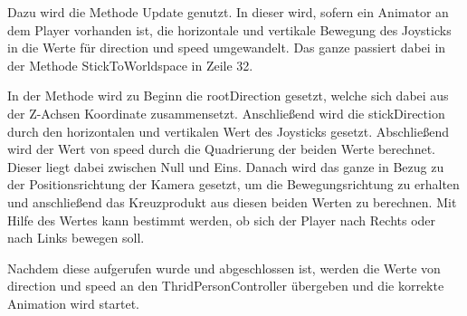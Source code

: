 			Dazu wird die Methode Update genutzt. In dieser wird, sofern ein Animator an dem Player vorhanden ist, die horizontale und vertikale Bewegung des Joysticks in die Werte für direction und speed umgewandelt. Das ganze passiert dabei in der Methode StickToWorldspace in Zeile 32. 

			In der Methode wird zu Beginn die rootDirection gesetzt, welche sich dabei aus der Z-Achsen Koordinate zusammensetzt. Anschließend wird die stickDirection durch den horizontalen und vertikalen Wert des Joysticks gesetzt. Abschließend wird der Wert von speed durch die Quadrierung der beiden Werte berechnet. Dieser liegt dabei zwischen Null und Eins. Danach wird das ganze in Bezug zu der Positionsrichtung der Kamera gesetzt, um die Bewegungsrichtung zu erhalten und anschließend das Kreuzprodukt aus diesen beiden Werten zu berechnen. Mit Hilfe des Wertes kann bestimmt werden, ob sich der Player nach Rechts oder nach Links bewegen soll.
	
			Nachdem diese aufgerufen wurde und abgeschlossen ist, werden die Werte von direction und speed an den ThridPersonController übergeben und die korrekte Animation wird startet.

